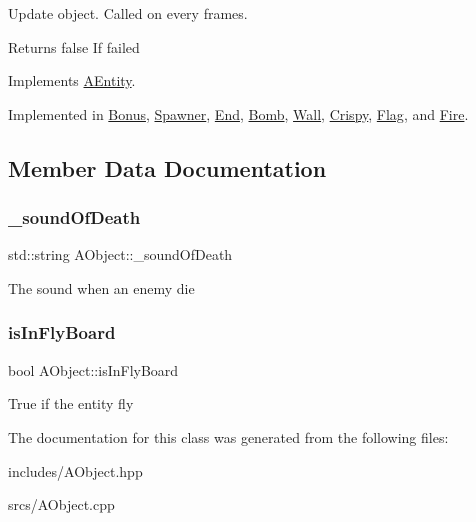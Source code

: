 Update object. Called on every frames. 

\begin{DoxyReturn}{Returns}
false If failed 
\end{DoxyReturn}


Implements \hyperlink{class_a_entity_adcfd3958ca43b8efd7cc58e7106a26a8}{A\+Entity}.



Implemented in \hyperlink{class_bonus_a0dd8aa4474c3d1ef494ed8a916cc16cd}{Bonus}, \hyperlink{class_spawner_a9325e76299405d5d74abfb72f4ea2380}{Spawner}, \hyperlink{class_end_a7154532cce1c86f4f5bfa98eb0c25574}{End}, \hyperlink{class_bomb_a9808d8efcc57b9ce7b0bd48d95875aad}{Bomb}, \hyperlink{class_wall_a29d3c4daa11dbb20d758b1fc285ed7a4}{Wall}, \hyperlink{class_crispy_ab33c8c68fa636df5721581e8f68ceae3}{Crispy}, \hyperlink{class_flag_adeaab6cd88bbc3284f8b4f1b2f78242b}{Flag}, and \hyperlink{class_fire_a86114cf78108a4b202b75e1f383b3e00}{Fire}.



\subsection{Member Data Documentation}
\mbox{\label{class_a_object_abd487a37ad66b909b7d082c9655d43e0}} 
\subsubsection{\texorpdfstring{\+\_\+sound\+Of\+Death}{\_soundOfDeath}}
{\footnotesize\ttfamily std\+::string A\+Object\+::\+\_\+sound\+Of\+Death\hspace{0.3cm}{\ttfamily [protected]}}

The sound when an enemy die \mbox{\label{class_a_object_a32efabd4a159239aaebc75c15e542a35}} 
\subsubsection{\texorpdfstring{is\+In\+Fly\+Board}{isInFlyBoard}}
{\footnotesize\ttfamily bool A\+Object\+::is\+In\+Fly\+Board}

True if the entity fly 

The documentation for this class was generated from the following files\+:\begin{DoxyCompactItemize}
\item 
includes/A\+Object.\+hpp\item 
srcs/A\+Object.\+cpp\end{DoxyCompactItemize}
